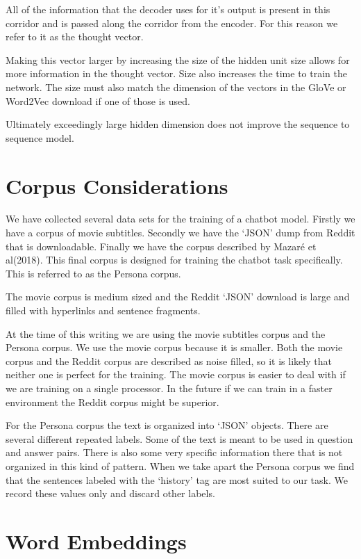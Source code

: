 All of the information that the decoder uses for it\textquoteright s
output is present in this corridor and is passed along the corridor
from the encoder. For this reason we refer to it as the thought vector.

Making this vector larger by increasing the size of the hidden unit
size allows for more information in the thought vector. Size also
increases the time to train the network. The size must also match
the dimension of the vectors in the GloVe or Word2Vec download if
one of those is used. 

Ultimately exceedingly large hidden dimension does not improve the
sequence to sequence model. 



\section{Corpus Considerations}
We have collected several data sets for the training of a chatbot model. Firstly we have a corpus of movie subtitles.
Secondly we have the `JSON' dump from Reddit that is downloadable. Finally
we have the corpus described by Mazar{\'{e}} et al(2018)\cite{DBLP:journals/corr/abs-1809-01984}.
This final corpus is designed for training the chatbot task specifically. This is 
referred to as the Persona corpus.

The movie corpus is medium sized and the Reddit `JSON' download is large
and filled with hyperlinks and sentence fragments. 

At the time of
this writing we are using the movie subtitles corpus and the Persona corpus. We use the movie
corpus because it is smaller. Both the movie corpus and the Reddit
corpus are described as noise filled, so it is likely that neither
one is perfect for the training. The movie corpus is easier to deal
with if we are training on a single processor. In the future if we
can train in a faster environment the Reddit corpus might be superior.

For the Persona corpus the text is organized into `JSON' objects. There
are several different repeated labels. Some of the text is meant to be used in question and answer pairs. There is also some very specific information there that is not
organized in this kind of pattern. When we take apart the Persona corpus
we find that the sentences labeled with the `history' tag are most suited to our task.
We record these values only and discard other labels.



\section{Word Embeddings}

